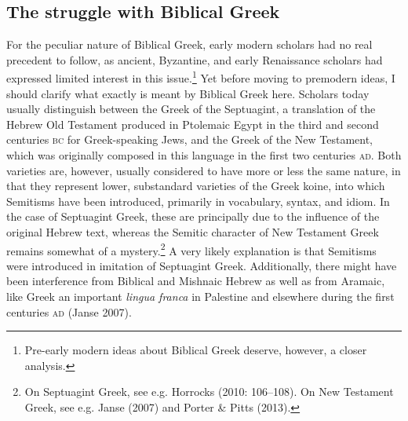 \subsection{The struggle with Biblical Greek}
\hypertarget{Toc19704830}{}\begin{styleStandard}
For the peculiar nature of Biblical Greek, early modern scholars had no real precedent to follow, as ancient, Byzantine, and early Renaissance scholars had expressed limited interest in this issue.\footnote{ Pre-early modern ideas about Biblical Greek deserve, however, a closer analysis.} Yet before moving to premodern ideas, I should clarify what exactly is meant by Biblical Greek here. Scholars today usually distinguish between the Greek of the Septuagint, a translation of the Hebrew Old Testament produced in Ptolemaic Egypt in the third and second centuries \textsc{bc }for Greek-speaking Jews, and the Greek of the New Testament, which was originally composed in this language in the first two centuries \textsc{ad}. Both varieties are, however, usually considered to have more or less the same nature, in that they represent lower, substandard varieties of the Greek koine, into which Semitisms have been introduced, primarily in vocabulary, syntax, and idiom. In the case of Septuagint Greek, these are principally due to the influence of the original Hebrew text, whereas the Semitic character of New Testament Greek remains somewhat of a mystery.\footnote{ On Septuagint Greek, see e.g. Horrocks (2010: 106–108). On New Testament Greek, see e.g. Janse (2007) and Porter \& Pitts (2013).} A very likely explanation is that Semitisms were introduced in imitation of Septuagint Greek. Additionally, there might have been interference from Biblical and Mishnaic Hebrew as well as from Aramaic, like Greek an important \textit{lingua franca} in Palestine and elsewhere during the first centuries \textsc{ad} (Janse 2007).
\end{styleStandard}

